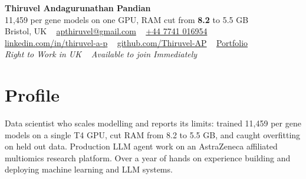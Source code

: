 \documentclass[a4paper,11pt]{article}
\newcommand{\num}[1]{\textbf{#1}}   %
\begin{document}
\begin{center}
  {\fontsize{22}{26}\selectfont\bfseries\color{navy} Thiruvel Andagurunathan Pandian}\\[4pt]
  {\fontsize{12}{14}\selectfont\color{navy} 11,459 per gene models on one GPU, RAM cut from \num{8.2} to 5.5 GB}\\[4pt]
  {\small
  Bristol, UK\nobreak\ \,\textperiodcentered\, \href{mailto:apthiruvel@gmail.com}{apthiruvel@gmail.com}\nobreak\ \,\textperiodcentered\, \href{tel:+447741016954}{+44 7741 016954}\nobreak\ \,\textperiodcentered\, \href{https://www.linkedin.com/in/thiruvel-a-p/}{linkedin.com/in/thiruvel-a-p}\nobreak\ \,\textperiodcentered\, \href{https://github.com/Thiruvel-AP}{github.com/Thiruvel-AP}\nobreak\ \,\textperiodcentered\, \href{https://thiruvel-ap.github.io/PersonalPortfolio/}{Portfolio}}\\[3pt]
  {\small\itshape\color{muted} Right to Work in UK\nobreak\ \,\textperiodcentered\, Available to join Immediately}

\end{center}

\section{Profile}
Data scientist who scales modelling and reports its limits: trained 11,459 per gene models on a single T4 GPU, cut RAM from 8.2 to 5.5 GB, and caught overfitting on held out data. Production LLM agent work on an AstraZeneca affiliated multiomics research platform. Over a year of hands on experience building and deploying machine learning and LLM systems.
\end{document}
